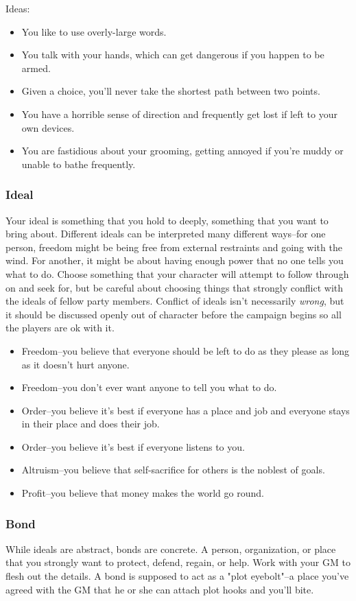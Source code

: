 \documentclass[draft]{article}
\begin{document}
Ideas:
\begin{itemize}
	\item You like to use overly-large words.
	\item You talk with your hands, which can get dangerous if you happen to be armed.
	\item Given a choice, you'll never take the shortest path between two points.
	\item You have a horrible sense of direction and frequently get lost if left to your own devices.
	\item You are fastidious about your grooming, getting annoyed if you're muddy or unable to bathe frequently.
\end{itemize}

\subsubsection{Ideal}
Your ideal is something that you hold to deeply, something that you want to bring about. Different ideals can be interpreted many different ways--for one person, freedom might be being free from external restraints and going with the wind. For another, it might be about having enough power that no one tells you what to do. Choose something that your character will attempt to follow through on and seek for, but be careful about choosing things that strongly conflict with the ideals of fellow party members. Conflict of ideals isn't necessarily \textit{wrong}, but it should be discussed openly out of character before the campaign begins so all the players are ok with it.

\begin{itemize}
	\item Freedom--you believe that everyone should be left to do as they please as long as it doesn't hurt anyone.
	\item Freedom--you don't ever want anyone to tell you what to do.
	\item Order--you believe it's best if everyone has a place and job and everyone stays in their place and does their job.
	\item Order--you believe it's best if everyone listens to you.
	\item Altruism--you believe that self-sacrifice for others is the noblest of goals.
	\item Profit--you believe that money makes the world go round.
\end{itemize}

\subsubsection{Bond}
While ideals are abstract, bonds are concrete. A person, organization, or place that you strongly want to protect, defend, regain, or help. Work with your GM to flesh out the details. A bond is supposed to act as a "plot eyebolt"--a place you've agreed with the GM that he or she can attach plot hooks and you'll bite.
\end{document}
